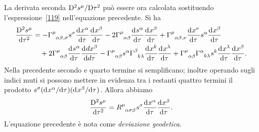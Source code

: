 La derivata seconda $\lcovder[2]{s^{\mu}}{\tau}$ può essere ora calcolata
sostituendo l'espressione~\eqref{119} nell'equazione precedente.  Si ha
\begin{equation}
  \begin{split}
    \covder[2]{s^{\mu}}{\tau} &= -\tensor{\Gamma}{^{\mu}_{\alpha \beta,\sigma}}
    s^{\sigma} \toder{x^{\alpha}}{\tau} \toder{x^{\beta }}{\tau} -
    2\tensor{\Gamma}{^{\mu}_{\alpha \beta}} \toder{s^{\alpha}}{\tau}
    \toder{x^{\beta}}{\tau} + \tensor{\Gamma}{^{\mu}_{\alpha \beta , \nu}}
    \toder{x^{\nu}}{\tau} s^{\alpha} \toder{x^{\beta}}{\tau} \\
    &\quad{} + 2\tensor{\Gamma}{^{\mu}_{\alpha \beta}} \toder{s^{\alpha}}{\tau}
    \toder{dx^{\beta}}{d \tau} - \tensor{\Gamma}{^{\mu}_{\alpha \beta}}
    s^{\alpha} \tensor{\Gamma}{^{\beta}_{k \lambda}} \toder{x^{k}}{\tau}
    \toder{x^{\lambda}}{\tau} + \tensor{\Gamma}{^{\mu}_{\alpha \beta}}
    \tensor{\Gamma}{^{\alpha}_{k \lambda}} s^{k} \toder{x^{\lambda}}{\tau}
    \toder{x^{\beta}}{\tau}.
  \end{split}
\end{equation}
Nella precedente secondo e quarto termine si semplificano; inoltre operando
sugli indici muti si possono mettere in evidenza tra i restanti quattro termini
il prodotto $s^{\sigma} (\ltoder{x^{\alpha}}{\tau})
(\ltoder{x^{\beta}}{\tau})$. Allora abbiamo
\begin{equation}
  \covder[2]{s^{\mu}}{\tau} = \tensor{R}{^{\mu}_{\alpha \sigma \beta}}
  s^{\sigma} \toder{x^{\alpha}}{\tau} \toder{x^{\beta}}{\tau}.
\end{equation}
L'equazione precedente è nota come \emph{deviazione geodetica}.

